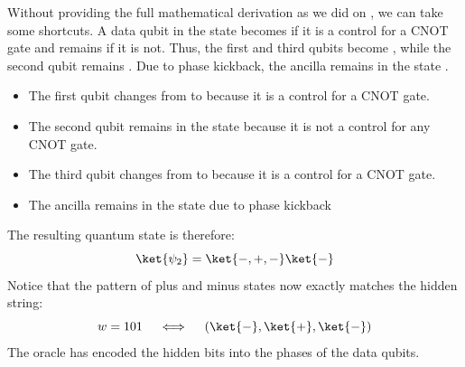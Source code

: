 \noindent
Without providing the full mathematical derivation as we did on , we can take some shortcuts. A data qubit in the state \ket{+} becomes \ket{-} if it is a control for a CNOT gate and remains \ket{+} if it is not. Thus, the first and third qubits become \ket{-}, while the second qubit remains \ket{+}. Due to phase kickback, the ancilla remains in the state \ket{-}.
\begin{itemize}
    \item The first qubit changes from \ket{+} to \ket{-} because it is a control for a CNOT gate.
    \item The second qubit remains in the state \ket{+} because it is not a control for any CNOT gate.
    \item The third qubit changes from \ket{+} to \ket{-} because it is a control for a CNOT gate.
    \item The ancilla remains in the state \ket{-} due to phase kickback
\end{itemize}
The resulting quantum state is therefore:
\begin{equation*}
    \ket{\psi_2} = \ket{-,+,-}\ket{-}
\end{equation*}
Notice that the pattern of plus and minus states now exactly matches the hidden string:
\begin{equation*}
    w = 101 \quad \iff \quad \left(\ket{-}, \ket{+}, \ket{-}\right)
\end{equation*}
The oracle has encoded the hidden bits into the phases of the data qubits.

\newpage

